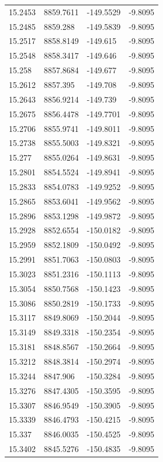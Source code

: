 \begin{table}[H]
\begin{tabular}{llll}
15.2453 & 8859.7611 & -149.5529 & -9.8095 \\
15.2485 & 8859.288 & -149.5839 & -9.8095 \\
15.2517 & 8858.8149 & -149.615 & -9.8095 \\
15.2548 & 8858.3417 & -149.646 & -9.8095 \\
15.258 & 8857.8684 & -149.677 & -9.8095 \\
15.2612 & 8857.395 & -149.708 & -9.8095 \\
15.2643 & 8856.9214 & -149.739 & -9.8095 \\
15.2675 & 8856.4478 & -149.7701 & -9.8095 \\
15.2706 & 8855.9741 & -149.8011 & -9.8095 \\
15.2738 & 8855.5003 & -149.8321 & -9.8095 \\
15.277 & 8855.0264 & -149.8631 & -9.8095 \\
15.2801 & 8854.5524 & -149.8941 & -9.8095 \\
15.2833 & 8854.0783 & -149.9252 & -9.8095 \\
15.2865 & 8853.6041 & -149.9562 & -9.8095 \\
15.2896 & 8853.1298 & -149.9872 & -9.8095 \\
15.2928 & 8852.6554 & -150.0182 & -9.8095 \\
15.2959 & 8852.1809 & -150.0492 & -9.8095 \\
15.2991 & 8851.7063 & -150.0803 & -9.8095 \\
15.3023 & 8851.2316 & -150.1113 & -9.8095 \\
15.3054 & 8850.7568 & -150.1423 & -9.8095 \\
15.3086 & 8850.2819 & -150.1733 & -9.8095 \\
15.3117 & 8849.8069 & -150.2044 & -9.8095 \\
15.3149 & 8849.3318 & -150.2354 & -9.8095 \\
15.3181 & 8848.8567 & -150.2664 & -9.8095 \\
15.3212 & 8848.3814 & -150.2974 & -9.8095 \\
15.3244 & 8847.906 & -150.3284 & -9.8095 \\
15.3276 & 8847.4305 & -150.3595 & -9.8095 \\
15.3307 & 8846.9549 & -150.3905 & -9.8095 \\
15.3339 & 8846.4793 & -150.4215 & -9.8095 \\
15.337 & 8846.0035 & -150.4525 & -9.8095 \\
15.3402 & 8845.5276 & -150.4835 & -9.8095 \\

\end{tabular}
\end{table}
